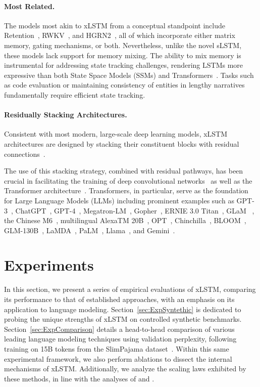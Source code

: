 \paragraph{Most Related.} The models most akin to xLSTM from a conceptual standpoint include Retention~\citep{Sun:23arxiv}, RWKV~\citep{Peng:23arxivshort,Peng:24arxivshort}, and HGRN2~\citep{Qin:24arxiv}, all of which incorporate either matrix memory, gating mechanisms, or both. Nevertheless, unlike the novel sLSTM, these models lack support for memory mixing. The ability to mix memory is instrumental for addressing state tracking challenges, rendering LSTMs more expressive than both State Space Models (SSMs) and Transformers~\citep{Merrill:24,Deletang:23}. Tasks such as code evaluation or maintaining consistency of entities in lengthy narratives fundamentally require efficient state tracking.

\paragraph{Residually Stacking Architectures.} Consistent with most modern, large-scale deep learning models, xLSTM architectures are designed by stacking their constituent blocks with residual connections~\citep{Srivastava:15,He:16}.

The use of this stacking strategy, combined with residual pathways, has been crucial in facilitating the training of deep convolutional networks~\citep{He:16} as well as the Transformer architecture~\citep{Vaswani:17}. Transformers, in particular, serve as the foundation for Large Language Models (LLMs) including prominent examples such as GPT-3~\citep{Brown:20short}, ChatGPT~\citep{Schulman:22short}, GPT-4~\citep{Achiam:23gpt4short}, Megatron-LM~\citep{Shoeybi:19}, Gopher~\citep{Rae:21short}, ERNIE 3.0 Titan~\citep{Wang:21arxivshort}, GLaM ~\citep{Du:21glamshort}, the Chinese M6~\citep{Lin:21}, multilingual AlexaTM 20B~\citep{Soltan:22}, OPT~\citep{Zhang:22opt}, Chinchilla~\citep{Hoffmann:22short}, BLOOM~\citep{Scao:22arxivshort}, GLM-130B~\citep{Zeng:22arxivshort}, LaMDA~\citep{Thoppilan:22short}, PaLM~\citep{Chowdhery:22short}, Llama~\citep{Touvron:23arxiv}, and Gemini~\citep{GeminiTeam:23arxiv,Reid:24arxiv}.

\section{Experiments}
\label{sec:Exp}

In this section, we present a series of empirical evaluations of xLSTM, comparing its performance to that of established approaches, with an emphasis on its application to language modeling. Section~\ref{sec:ExpSyntethic} is dedicated to probing the unique strengths of xLSTM on controlled synthetic benchmarks. 
Section~\ref{sec:ExpComparison} details a head-to-head comparison of various leading language modeling techniques using validation perplexity, following training on 15B tokens from the SlimPajama dataset~\citep{Soboleva:23}. Within this same experimental framework, we also perform ablations to dissect the internal mechanisms of xLSTM. Additionally, we analyze the scaling laws exhibited by these methods, in line with the analyses of \citet{Kaplan:20} and \citet{Brown:20short}.

